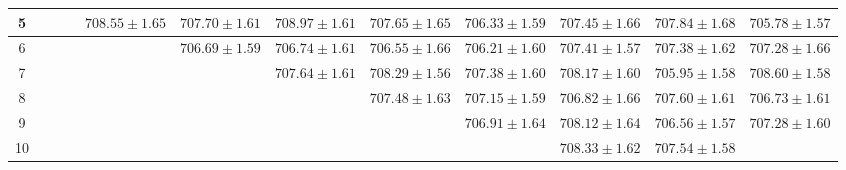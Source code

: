 \documentclass{article}
\begin{document}
\begin{tcolorbox}[colback=white!95!gray, colframe=black!75, boxrule=0.8pt, arc=4pt, width=\textwidth, title=Two Loop Simulation ]
\begin{table}[H]
\begin{adjustbox}{max width=\textwidth}
\begin{tabular}{|c|c|c|c|c|c|c|c|c|c|c|c|}
				\hline
				5                 &                   &                   &                   & $708.55 \pm 1.65$ & $707.70 \pm 1.61$ & $708.97 \pm
				1.61$             & $707.65 \pm 1.65$ & $706.33 \pm 1.59$ & $707.45 \pm
				1.66$             & $707.84 \pm 1.68$ & $705.78 \pm 1.57$                                                                                                                                                                                     \\
				\hline
				6                 &                   &                   &                   &                   & $706.69 \pm 1.59$ & $706.74 \pm 1.61$ & $706.55 \pm
				1.66$             & $706.21 \pm 1.60$ & $707.41 \pm 1.57$ & $707.38 \pm
				1.62$             & $707.28 \pm 1.66$                                                                                                                                                                                                         \\
				\hline
				7                 &                   &                   &                   &                   &                   & $707.64 \pm 1.61$ & $708.29 \pm 1.56$ & $707.38
				\pm 1.60$         & $708.17 \pm 1.60$ & $705.95 \pm 1.58$ & $708.60 \pm 1.58$                                                                                                                                                                 \\
				\hline
				8                 &                   &                   &                   &                   &                   &                   & $707.48 \pm 1.63$ & $707.15 \pm 1.59$ & $706.82
				\pm 1.66$         & $707.60 \pm 1.61$ & $706.73 \pm 1.61$                                                                                                                                                                                     \\
				\hline
				9                 &                   &                   &                   &                   &                   &                   &                   & $706.91 \pm 1.64$ & $708.12 \pm 1.64$ &
				$706.56 \pm 1.57$ & $707.28 \pm 1.60$                                                                                                                                                                                                         \\
				\hline
				10                &                   &                   &                   &                   &                   &                   &                   &                   & $708.33 \pm 1.62$ & $707.54 \pm 1.58$ &

\end{tabular}
\end{adjustbox}
\end{table}
\end{tcolorbox}
\end{document}

